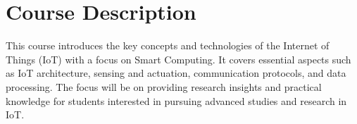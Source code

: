 \section{Course Description}

This course introduces the key concepts and technologies of the Internet of Things (IoT) with a focus on Smart Computing. 
It covers essential aspects such as IoT architecture, sensing and actuation, communication protocols, and data processing. 
The focus will be on providing research insights and practical knowledge for students interested in pursuing advanced studies and research in IoT.
